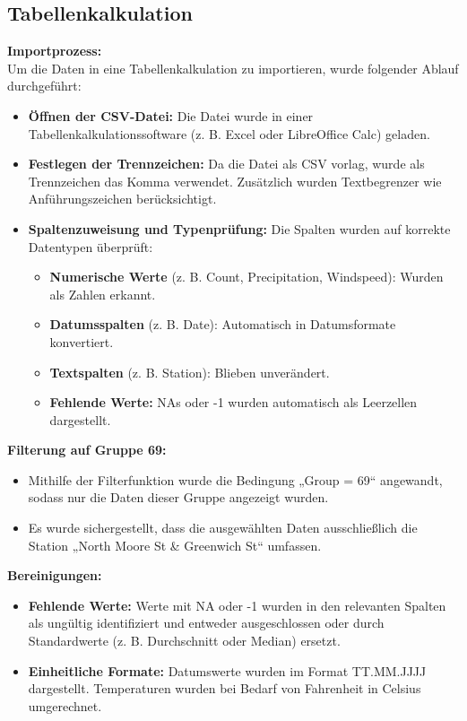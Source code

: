 \documentclass{article}
\begin{document}
\newpage 

\subsection{Tabellenkalkulation}
\label{sec:tabellenkalkulation}

\textbf{Importprozess:} \\

Um die Daten in eine Tabellenkalkulation zu importieren, wurde folgender Ablauf durchgeführt:
\begin{itemize}
    \item \textbf{Öffnen der CSV-Datei:} Die Datei wurde in einer Tabellenkalkulationssoftware (z. B. Excel oder LibreOffice Calc) geladen.
    \item \textbf{Festlegen der Trennzeichen:} Da die Datei als CSV vorlag, wurde als Trennzeichen das Komma verwendet. Zusätzlich wurden Textbegrenzer wie Anführungszeichen berücksichtigt.
    \item \textbf{Spaltenzuweisung und Typenprüfung:} 
    Die Spalten wurden auf korrekte Datentypen überprüft:
    \begin{itemize}
        \item \textbf{Numerische Werte} (z. B. Count, Precipitation, Windspeed): Wurden als Zahlen erkannt.
        \item \textbf{Datumsspalten} (z. B. Date): Automatisch in Datumsformate konvertiert.
        \item \textbf{Textspalten} (z. B. Station): Blieben unverändert.
        \item \textbf{Fehlende Werte:} NAs oder -1 wurden automatisch als Leerzellen dargestellt.
    \end{itemize}
\end{itemize}

\textbf{Filterung auf Gruppe 69:}
\begin{itemize}
    \item Mithilfe der Filterfunktion wurde die Bedingung „Group = 69“ angewandt, sodass nur die Daten dieser Gruppe angezeigt wurden.
    \item Es wurde sichergestellt, dass die ausgewählten Daten ausschließlich die Station „North Moore St \& Greenwich St“ umfassen.
\end{itemize}

\textbf{Bereinigungen:}
\begin{itemize}
    \item \textbf{Fehlende Werte:} Werte mit NA oder -1 wurden in den relevanten Spalten als ungültig identifiziert und entweder ausgeschlossen oder durch Standardwerte (z. B. Durchschnitt oder Median) ersetzt.
    \item \textbf{Einheitliche Formate:} Datumswerte wurden im Format TT.MM.JJJJ dargestellt. Temperaturen wurden bei Bedarf von Fahrenheit in Celsius umgerechnet.
\end{itemize}
\end{document}
